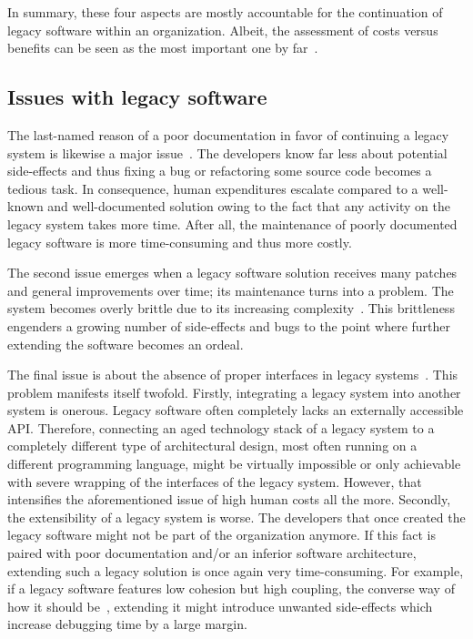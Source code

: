 \documentclass[12pt,a4paper,twoside]{report}
\begin{document}
In summary, these four aspects are mostly accountable for the continuation of legacy software
within an organization. Albeit, the assessment of costs versus benefits
can be seen as the most important one by far~\cite{schneidewind-preserve-or-redesign}.


\subsection{Issues with legacy software} \label{issues-legacy-software}

The last-named reason of a poor documentation in favor of continuing a
legacy system is likewise a major issue~\cite{bisbal-legacy-issues}.
The developers know far less about potential side-effects and thus
fixing a bug or refactoring some source code becomes a tedious task.
In consequence, human expenditures escalate compared to a well-known and well-documented
solution owing to the fact that any activity on the legacy system takes more time.
After all, the maintenance of poorly documented legacy software
is more time-consuming and thus more costly.

The second issue emerges when a legacy software solution receives many
patches and general improvements over time; its maintenance
turns into a problem. The system becomes overly brittle due to its
increasing complexity~\cite{seacord-modernizing-legacy, tilley-perspectives-reengineering}.
This brittleness engenders a growing number of side-effects and bugs
to the point where further extending the software becomes an ordeal.

The final issue is about the absence of proper interfaces
in legacy systems~\cite{bisbal-legacy-issues}. This problem manifests itself twofold.
Firstly, integrating a legacy system into another system is onerous.
Legacy software often completely lacks an externally accessible API.
Therefore, connecting an aged technology stack of a legacy system to a completely
different type of architectural design, most often running on a different programming language,
might be virtually impossible or only achievable with severe wrapping
of the interfaces of the legacy system. However, that intensifies the aforementioned
issue of high human costs all the more.
Secondly, the extensibility of a legacy system is worse.
The developers that once created the legacy software might not be part of the
organization anymore. If this fact is paired with poor documentation and/or
an inferior software architecture, extending such a legacy solution is once again
very time-consuming. For example, if a legacy software features
low cohesion but high coupling, the converse way of how it should be~\cn,
extending it might introduce unwanted side-effects which increase debugging
time by a large margin.
\end{document}
